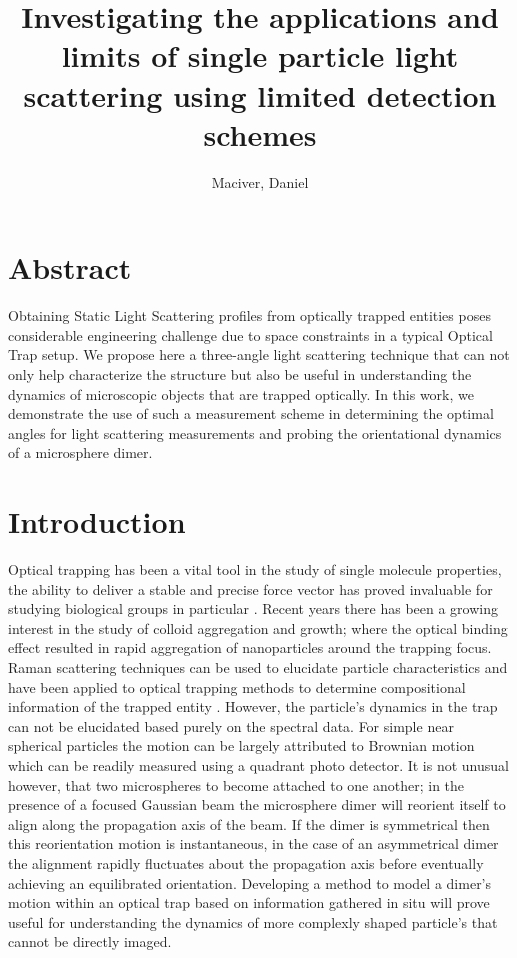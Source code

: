 \documentclass[11pt]{article}
\title{Investigating the applications and limits of single particle light scattering using limited detection schemes}
\author{Maciver, Daniel}
\begin{document}
	
\maketitle

\section*{Abstract}
Obtaining Static Light Scattering profiles from optically trapped entities poses considerable engineering challenge due to space constraints in a typical Optical Trap setup. We propose here a three-angle light scattering technique that can not only help characterize the structure but also be useful in understanding the dynamics of microscopic objects that are trapped optically. In this work, we demonstrate the use of such a measurement scheme in determining the optimal angles for light scattering measurements and probing the orientational dynamics of a microsphere dimer. 

\section*{Introduction}
Optical trapping has been a vital tool in the study of single molecule properties, the ability to deliver a stable and precise force vector has proved invaluable for studying biological groups in particular \cite{2}. Recent years there has been a growing interest in the study of colloid aggregation and growth; where the optical binding effect resulted in rapid aggregation of nanoparticles around the trapping focus. Raman scattering techniques can be used to elucidate particle characteristics and have been applied to optical trapping methods to determine compositional information of the trapped entity \cite{4,7}. However, the particle's dynamics in the trap can not be elucidated based purely on the spectral data. For simple near spherical particles the motion can be largely attributed to Brownian motion which can be readily measured using a quadrant photo detector. It is not unusual however, that two microspheres to become attached to one another; in the presence of a focused Gaussian beam the microsphere dimer will reorient itself to align along the propagation axis of the beam. If the dimer is symmetrical then this reorientation motion is instantaneous, in the case of an asymmetrical dimer the alignment rapidly fluctuates about the propagation axis before eventually achieving an equilibrated orientation. Developing a method to model a dimer's motion within an optical trap based on information gathered in situ will prove useful for understanding the dynamics of more complexly shaped particle's that cannot be directly imaged.
\end{document}
